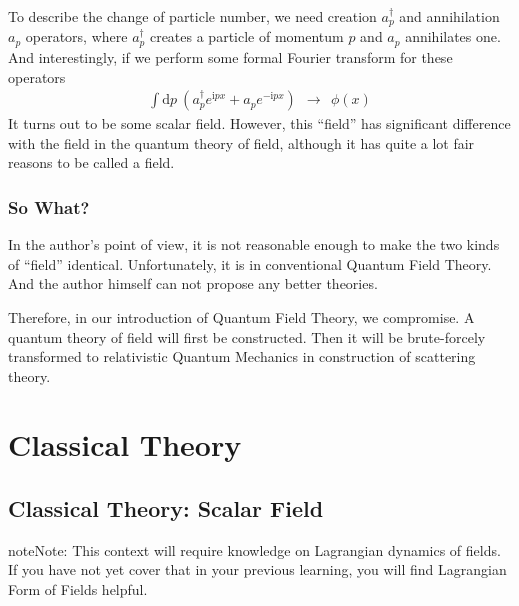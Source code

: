 \documentclass[letterpaper,10pt,english]{sphinxmanual}
\begin{document}
To describe the change of particle number, we need creation \(a^\dagger_p\) and annihilation \(a_p\) operators, where \(a^\dagger_p\) creates a particle of momentum \(p\) and \(a_p\) annihilates one. And interestingly, if we perform some formal Fourier transform for these operators
\begin{equation*}
\begin{split}\int \mathrm{d}p\ (a^\dagger_p e^{\mathrm{i}px} + a_p e^{-\mathrm{i}px})\ \ \rightarrow\ \ \phi(x)\end{split}
\end{equation*}
It turns out to be some scalar field. However, this ``field'' has significant difference with the field in the quantum theory of field, although it has quite a lot fair reasons to be called a field.


\subsection{So What?}
\label{\detokenize{theo_what:so-what}}
In the author's point of view, it is not reasonable enough to make the two kinds of ``field'' identical. Unfortunately, it is in conventional Quantum Field Theory. And the author himself can not propose any better theories.

Therefore, in our introduction of Quantum Field Theory, we compromise. A quantum theory of field will first be constructed. Then it will be brute-forcely transformed to relativistic Quantum Mechanics in construction of scattering theory.


\chapter{Classical Theory}
\label{\detokenize{clstheo:classical-theory}}\label{\detokenize{clstheo::doc}}

\section{Classical Theory: Scalar Field}
\label{\detokenize{clstheo_scalar::doc}}\label{\detokenize{clstheo_scalar:classical-theory-scalar-field}}
\begin{sphinxadmonition}{note}{Note:}
This context will require knowledge on Lagrangian dynamics of fields. If you have not yet cover that in your previous learning, you will find Lagrangian Form of Fields helpful.
\end{sphinxadmonition}
\end{document}
